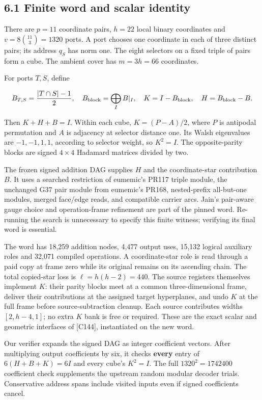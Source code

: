 \documentclass[
  11pt,
]{article}
\begin{document}
\subsection{6.1 Finite word and scalar
identity}\label{finite-word-and-scalar-identity}

There are \(p=11\) coordinate pairs, \(h=22\) local binary coordinates
and \(v=8\binom{11}{3}=1320\) ports. A port chooses one coordinate in
each of three distinct pairs; its address \(q_S\) has norm one. The
eight selectors on a fixed triple of pairs form a cube. The ambient
cover has \(m=3h=66\) coordinates.

For ports \(T,S\), define

\[
B_{T,S}=\frac{|T\cap S|-1}{2},\quad
B_{\rm block}=\bigoplus_I B|_I,\quad
K=I-B_{\rm block},\quad H=B_{\rm block}-B.
\]

Then \(K+H+B=I\). Within each cube, \(K=(P-A)/2\), where \(P\) is
antipodal permutation and \(A\) is adjacency at selector distance one.
Its Walsh eigenvalues are \(-1,-1,1,1\), according to selector weight,
so \(K^2=I\). The opposite-parity blocks are signed \(4\times4\)
Hadamard matrices divided by two.

The frozen signed addition DAG supplies \(H\) and the coordinate-star
contribution \(B\). It uses a searched restriction of eumemic's PR117
triple module, the unchanged G37 pair module from eumemic's PR168,
nested-prefix all-but-one modules, merged face/edge reads, and
compatible carrier arcs. Jain's pair-aware gauge choice and
operation-frame refinement are part of the pinned word. Re-running the
search is unnecessary to specify this finite witness; verifying its
final word is essential.

The word has 18,259 addition nodes, 4,477 output uses, 15,132 logical
auxiliary roles and 32,071 compiled operations. A coordinate-star role
is read through a paid copy at frame zero while its original remains on
its ascending chain. The total copied-star loss is \(\ell=h(h-2)=440\).
The source registers themselves implement \(K\): their parity blocks
meet at a common three-dimensional frame, deliver their contributions at
the assigned target hyperplanes, and undo \(K\) at the full frame before
source-subtraction cleanup. Each source contributes widths
\([2,h-4,1]\); no extra \(K\) bank is free or required. These are the
exact scalar and geometric interfaces of {[}C144{]}, instantiated on the
new word.

Our verifier expands the signed DAG as integer coefficient vectors.
After multiplying output coefficients by six, it checks \textbf{every}
entry of \(6(H+B+K)=6I\) and every cube's \(K^2=I\). The full
\(1320^2=1742400\) coefficient check supplements the upstream random
modular decoder trials. Conservative address spans include visited
inputs even if signed coefficients cancel.
\end{document}

